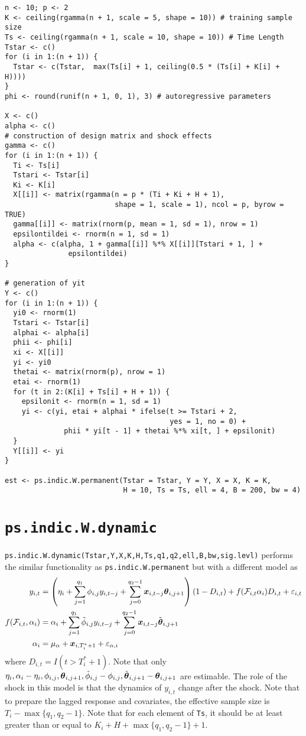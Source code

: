 \documentclass[12pt]{article}
\begin{document}
 \begin{verbatim}
n <- 10; p <- 2
K <- ceiling(rgamma(n + 1, scale = 5, shape = 10)) # training sample size
Ts <- ceiling(rgamma(n + 1, scale = 10, shape = 10)) # Time Length
Tstar <- c()
for (i in 1:(n + 1)) {
  Tstar <- c(Tstar,  max(Ts[i] + 1, ceiling(0.5 * (Ts[i] + K[i] + H))))
}
phi <- round(runif(n + 1, 0, 1), 3) # autoregressive parameters

X <- c()
alpha <- c()
# construction of design matrix and shock effects
gamma <- c()
for (i in 1:(n + 1)) {
  Ti <- Ts[i]
  Tstari <- Tstar[i]
  Ki <- K[i]
  X[[i]] <- matrix(rgamma(n = p * (Ti + Ki + H + 1),
                          shape = 1, scale = 1), ncol = p, byrow = TRUE) 
  gamma[[i]] <- matrix(rnorm(p, mean = 1, sd = 1), nrow = 1)
  epsilontildei <- rnorm(n = 1, sd = 1)
  alpha <- c(alpha, 1 + gamma[[i]] %*% X[[i]][Tstari + 1, ] +
               epsilontildei)
}

# generation of yit
Y <- c()
for (i in 1:(n + 1)) {
  yi0 <- rnorm(1)
  Tstari <- Tstar[i]
  alphai <- alpha[i]
  phii <- phi[i]
  xi <- X[[i]]
  yi <- yi0
  thetai <- matrix(rnorm(p), nrow = 1)
  etai <- rnorm(1)
  for (t in 2:(K[i] + Ts[i] + H + 1)) {
    epsilonit <- rnorm(n = 1, sd = 1)
    yi <- c(yi, etai + alphai * ifelse(t >= Tstari + 2, 
                                       yes = 1, no = 0) +
              phii * yi[t - 1] + thetai %*% xi[t, ] + epsilonit)
  }
  Y[[i]] <- yi
}

est <- ps.indic.W.permanent(Tstar = Tstar, Y = Y, X = X, K = K, 
                            H = 10, Ts = Ts, ell = 4, B = 200, bw = 4)
 \end{verbatim}
 
 \section{\texttt{ps.indic.W.dynamic}}
 
 \texttt{ps.indic.W.dynamic(Tstar,Y,X,K,H,Ts,q1,q2,ell,B,bw,sig.levl)} performs the similar functionality as  \texttt{ps.indic.W.permanent} but with a different model as 
 \begin{align*}
 	y_{i,t}
 	&= \left(\eta_i + \sum_{j=1}^{q_1} \phi_{i,j} y_{i, t-j} + \sum_{j=0}^{q_2-1} \boldsymbol{x}_{i, t-j}\boldsymbol{\theta}_{i, j + 1} \right) (1-D_{i,t}) + f(\mathcal{F}_{i, t} \alpha_i)D_{i,t} + \varepsilon_{i,t}  \\
 	f(\mathcal{F}_{i,t},\alpha_i)	 & = \alpha_i +\sum_{j=1}^{q_1} \tilde{\phi}_{i, j} y_{i, t-j} + \sum_{j=0}^{q_2-1} \boldsymbol{x}_{i, t-j} \tilde{\boldsymbol{\theta}}_{i, j +1} \\
 	\alpha_i & = \mu_{\alpha} + \boldsymbol{x}_{i, T_i^*+1} + \varepsilon_{\alpha, i}
 \end{align*}
 where $D_{i,t}=I(t > T_i^*+1)$. Note that only $\eta_i, \alpha_i - \eta_i, \phi_{i,j}, \boldsymbol{\theta}_{i, j+1}, \tilde{\phi}_{i,j}-\phi_{i,j}, \tilde{\boldsymbol{\theta}}_{i,j+1}-\boldsymbol{\theta}_{i, j+1}$ are estimable.
The role of the shock in this model is that the dynamics of $y_{i,t}$ change after the shock. Note that to prepare the lagged response and covariates, the effective sample size is $T_i-\max\{q_1, q_2-1\}$.  Note that for each element of \texttt{Ts}, it should be at least greater than or equal to $K_i + H + \max\{q_1, q_2-1\}+1$.
\end{document}
